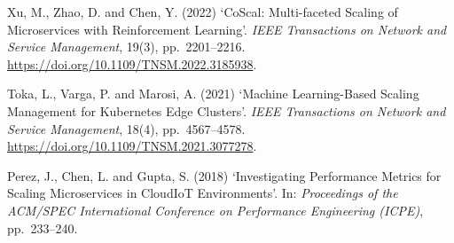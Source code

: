 \vspace{1em}

\noindent
Xu, M., Zhao, D. and Chen, Y. (2022) `CoScal: Multi-faceted Scaling of Microservices with Reinforcement Learning'. \textit{IEEE Transactions on Network and Service Management}, 19(3), pp.~2201--2216. \url{https://doi.org/10.1109/TNSM.2022.3185938}.

\vspace{1em}

\noindent
Toka, L., Varga, P. and Marosi, A. (2021) `Machine Learning-Based Scaling Management for Kubernetes Edge Clusters'. \textit{IEEE Transactions on Network and Service Management}, 18(4), pp.~4567--4578. \url{https://doi.org/10.1109/TNSM.2021.3077278}.

\vspace{1em}

\noindent
Perez, J., Chen, L. and Gupta, S. (2018) `Investigating Performance Metrics for Scaling Microservices in CloudIoT Environments'. In: \textit{Proceedings of the ACM/SPEC International Conference on Performance Engineering (ICPE)}, pp.~233--240.